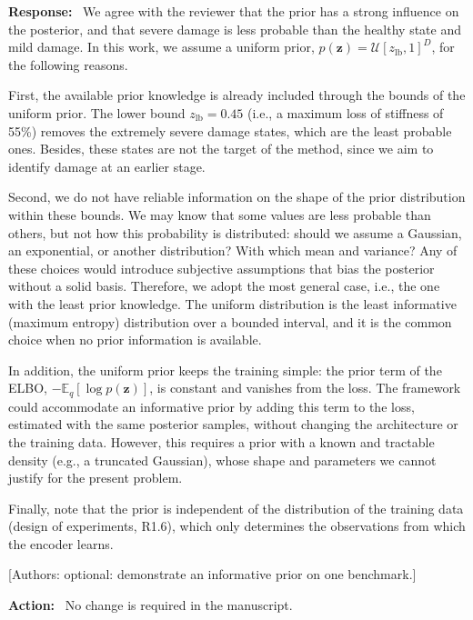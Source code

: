 \documentclass[11pt]{article}
\newenvironment{response}{\par\smallskip\noindent\color{resp}\textbf{Response:}\ }{\par}
\newenvironment{action}{\par\smallskip\noindent\color{resp}\textbf{Action:}\ }{\par}
\newcommand{\authornote}[1]{\textcolor{note}{\textsf{[Authors: #1]}}}
\newcommand{\z}{\mathbf{z}}
\begin{document}
\begin{response}
We agree with the reviewer that the prior has a strong influence on the posterior, and that severe damage is less probable than the healthy state and mild damage.
In this work, we assume a uniform prior, $p(\z)=\mathcal{U}[z_{\text{lb}},1]^{D}$, for the following reasons.

First, the available prior knowledge is already included through the bounds of the uniform prior.
The lower bound $z_{\text{lb}}=0.45$ (i.e., a maximum loss of stiffness of 55\%) removes the extremely severe damage states, which are the least probable ones.
Besides, these states are not the target of the method, since we aim to identify damage at an earlier stage.

Second, we do not have reliable information on the shape of the prior distribution within these bounds.
We may know that some values are less probable than others, but not how this probability is distributed: should we assume a Gaussian, an exponential, or another distribution? With which mean and variance?
Any of these choices would introduce subjective assumptions that bias the posterior without a solid basis.
Therefore, we adopt the most general case, i.e., the one with the least prior knowledge.
The uniform distribution is the least informative (maximum entropy) distribution over a bounded interval, and it is the common choice when no prior information is available.

In addition, the uniform prior keeps the training simple: the prior term of the ELBO, $-\mathbb{E}_q[\log p(\z)]$, is constant and vanishes from the loss.
The framework could accommodate an informative prior by adding this term to the loss, estimated with the same posterior samples, without changing the architecture or the training data.
However, this requires a prior with a known and tractable density (e.g., a truncated Gaussian), whose shape and parameters we cannot justify for the present problem.

Finally, note that the prior is independent of the distribution of the training data (design of experiments, R1.6), which only determines the observations from which the encoder learns.
\end{response}
\authornote{optional: demonstrate an informative prior on one benchmark.}

\begin{action}
No change is required in the manuscript.
\end{action}
\end{document}
